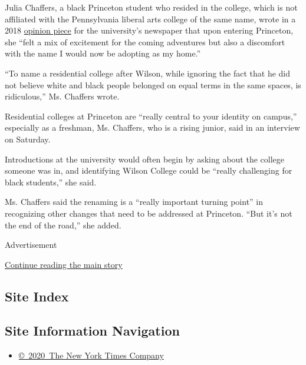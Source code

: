 Julia Chaffers, a black Princeton student who resided in the college,
which is not affiliated with the Pennsylvania liberal arts college of
the same name, wrote in a 2018
\href{https://www.dailyprincetonian.com/article/2018/12/what-it-means-to-live-in-wilson}{opinion
piece} for the university's newspaper that upon entering Princeton, she
``felt a mix of excitement for the coming adventures but also a
discomfort with the name I would now be adopting as my home.''

``To name a residential college after Wilson, while ignoring the fact
that he did not believe white and black people belonged on equal terms
in the same spaces, is ridiculous,'' Ms. Chaffers wrote.

Residential colleges at Princeton are ``really central to your identity
on campus,'' especially as a freshman, Ms. Chaffers, who is a rising
junior, said in an interview on Saturday.

Introductions at the university would often begin by asking about the
college someone was in, and identifying Wilson College could be ``really
challenging for black students,'' she said.

Ms. Chaffers said the renaming is a ``really important turning point''
in recognizing other changes that need to be addressed at Princeton.
``But it's not the end of the road,'' she added.

Advertisement

\protect\hyperlink{after-bottom}{Continue reading the main story}

\hypertarget{site-index}{%
\subsection{Site Index}\label{site-index}}

\hypertarget{site-information-navigation}{%
\subsection{Site Information
Navigation}\label{site-information-navigation}}

\begin{itemize}
\tightlist
\item
  \href{https://help.nytimes3xbfgragh.onion/hc/en-us/articles/115014792127-Copyright-notice}{©~2020~The
  New York Times Company}
\end{itemize}

